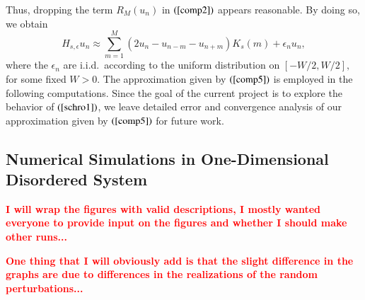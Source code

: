 \documentclass[final,1p,times]{elsarticle}
\newcommand{\bb}[1]{\begin{equation}\label{#1}}
\newcommand{\ee}{\end{equation}}
\newcommand{\no}{\noindent}
\def\R#1{$(\ref{#1})$}
\theoremstyle{remark}
\theoremstyle{definition}
\newcommand{\josh}[1]{\textcolor{red}{\textbf{#1}}}
\begin{document}

Thus, dropping the term $R_M(u_n)$ in \R{comp2} appears reasonable. By doing so, we obtain
\bb{comp5}
H_{s,\epsilon}u_n \approx \sum_{m=1}^M (2u_n - u_{n-m}-u_{n+m})K_s(m) + \epsilon_nu_n,
\ee
where the $\epsilon_n$ are i.i.d.~according to the uniform distribution on $[-W/2,W/2],$ for some fixed $W>0.$ The approximation given by \R{comp5} is employed in the following computations. Since the goal of the current project is to explore the behavior of \R{schro1}, we leave detailed error and convergence analysis of our approximation given by \R{comp5} for future work.





\subsection{Numerical Simulations in One-Dimensional Disordered System}

\no\josh{I will wrap the figures with valid descriptions, I mostly wanted everyone to provide input on the figures and whether I should make other runs...}

\vspace{2mm}

\no\josh{One thing that I will obviously add is that the slight difference in the graphs are due to differences in the realizations of the random perturbations...}
\end{document}
